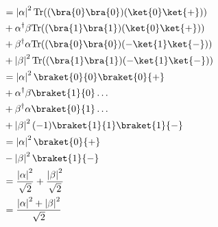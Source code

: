 \documentclass{article}
\newcommand{\trace}{{\rm Tr}}
\newcommand{\abs}[1]{\left\lvert #1 \right\rvert}
\begin{document}
\begin{enumerate}
\begin{enumerate}
$$\begin{aligned}
                                                              & = \abs{\alpha}^2\trace((\bra{0}\bra{0})(\ket{0}\ket{+}))                                                         \\
                                                              & + \alpha^\dagger\beta\trace((\bra{1}\bra{1})(\ket{0}\ket{+}))                                                    \\
                                                              & + \beta^\dagger\alpha\trace((\bra{0}\bra{0})(-\ket{1}\ket{-}))                                                   \\
                                                              & + \abs{\beta}^2\trace((\bra{1}\bra{1})(-\ket{1}\ket{-}))                                                         \\
                                                              & = \abs{\alpha}^2\braket{0}{0}\braket{0}{+}                                                                       \\
                                                              & + \alpha^\dagger\beta\braket{1}{0}\dots                                                                          \\
                                                              & + \beta^\dagger\alpha\braket{0}{1}\dots                                                                          \\
                                                              & + \abs{\beta}^2(-1)\braket{1}{1}\braket{1}{-}                                                                    \\
                                                              & = \abs{\alpha}^2\braket{0}{+}                                                                                    \\
                                                              & - \abs{\beta}^2\braket{1}{-}                                                                                     \\
                                                              & = \frac{\abs{\alpha}^2}{\sqrt{2}} + \frac{\abs{\beta}^2}{\sqrt{2}}                                               \\
                                                              & = \frac{\abs{\alpha}^2+\abs{\beta}^2}{\sqrt{2}}                                                                  \\
                  \end{aligned}$$


\end{enumerate}
\end{enumerate}
\end{document}
